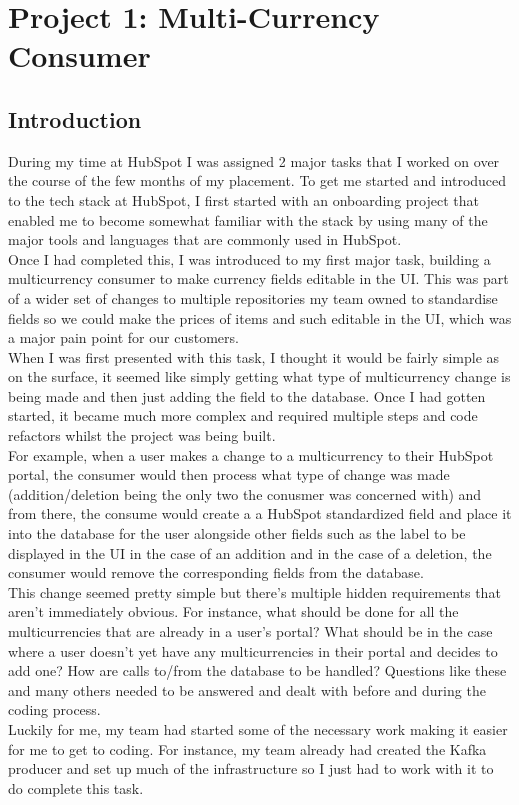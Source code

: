 \chapter{Project 1: Multi-Currency Consumer}

\section{Introduction}
During my time at HubSpot I was assigned 2 major tasks that I worked on over the course of the few months of my placement. To get me started and introduced to the tech stack at HubSpot, I first started with an onboarding project that enabled me to become somewhat familiar with the stack by using many of the major tools and languages that are commonly used in HubSpot. \\ Once I had completed this, I was introduced to my first major task, building a multicurrency consumer to make currency fields editable in the UI. This was part of a wider set of changes to multiple repositories my team owned to standardise fields so we could make the prices of items and such editable in the UI, which was a major pain point for our customers.\newline \\ When I was first presented with this task, I thought it would be fairly simple as on the surface, it seemed like simply getting what type of multicurrency change is being made and then just adding the field to the database. Once I had gotten started, it became much more complex and required multiple steps and code refactors whilst the project was being built. \\ For example, when a user makes a change to a multicurrency to their HubSpot portal, the consumer would then process what type of change was made (addition/deletion being the only two the conusmer was concerned with) and from there, the consume would create a a HubSpot standardized field and place it into the database for the user alongside other fields such as the label to be displayed in the UI in the case of an addition and in the case of a deletion, the consumer would remove the corresponding fields from the database. \newline \\ This change seemed pretty simple but there's multiple hidden requirements that aren't immediately obvious. For instance, what should be done for all the multicurrencies that are already in a user's portal? What should be in the case where a user doesn't yet have any multicurrencies in their portal and decides to add one? How are calls to/from the database to be handled? Questions like these and many others needed to be answered and dealt with before and during the coding process. \\ Luckily for me, my team had started some of the necessary work making it easier for me to get to coding. For instance, my team already had created the Kafka producer and set up much of the infrastructure so I just had to work with it to do complete this task.

